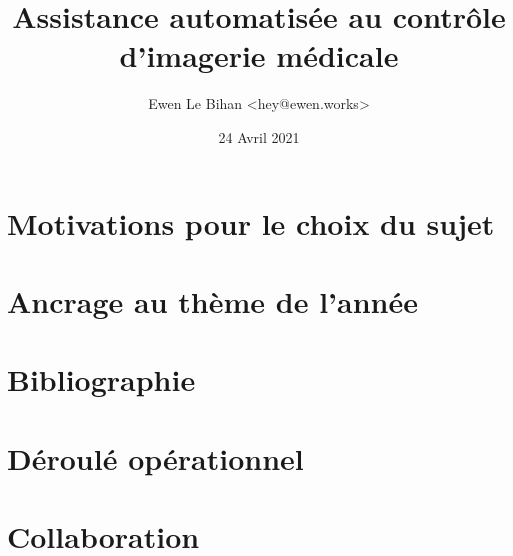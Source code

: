\documentclass{article}
\title{Assistance automatisée au contrôle d'imagerie médicale}
\author{Ewen Le Bihan \textless hey@ewen.works\textgreater}
\date{24 Avril 2021}
\begin{document}
\maketitle

\section{Motivations pour le choix du sujet}
\section{Ancrage au thème de l'année}
\section{Bibliographie}
\section{Déroulé opérationnel}
\section{Collaboration}
\end{document}
